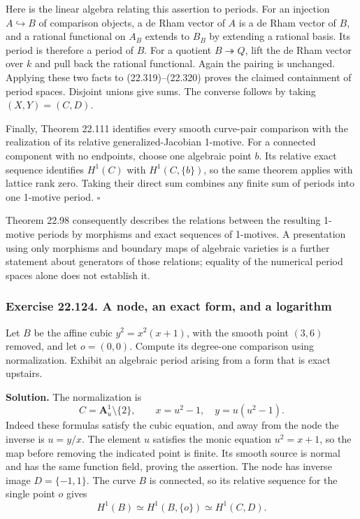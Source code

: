 \documentclass[
  11pt,
  a4paper,
]{article}
\begin{document}
Here is the linear algebra relating this assertion to periods. For an
injection \(A\hookrightarrow B\) of comparison objects, a de Rham vector
of \(A\) is a de Rham vector of \(B\), and a rational functional on
\(A_B\) extends to \(B_B\) by extending a rational basis. Its period is
therefore a period of \(B\). For a quotient \(B\twoheadrightarrow Q\),
lift the de Rham vector over \(k\) and pull back the rational
functional. Again the pairing is unchanged. Applying these two facts to
(22.319)--(22.320) proves the claimed containment of period spaces.
Disjoint unions give sums. The converse follows by taking
\((X,Y)=(C,D)\).

Finally, Theorem 22.111 identifies every smooth curve-pair comparison
with the realization of its relative generalized-Jacobian 1-motive. For
a connected component with no endpoints, choose one algebraic point
\(b\). Its relative exact sequence identifies \(H^1(C)\) with
\(H^1(C,\{b\})\), so the same theorem applies with lattice rank zero.
Taking their direct sum combines any finite sum of periods into one
1-motive period. \(\square\)

Theorem 22.98 consequently describes the relations between the resulting
1-motive periods by morphisms and exact sequences of 1-motives. A
presentation using only morphisms and boundary maps of algebraic
varieties is a further statement about generators of those relations;
equality of the numerical period spaces alone does not establish it.

\subsubsection{Exercise 22.124. A node, an exact form, and a
logarithm}\label{exercise-22.124.-a-node-an-exact-form-and-a-logarithm}

Let \(B\) be the affine cubic \(y^2=x^2(x+1)\), with the smooth point
\((3,6)\) removed, and let \(o=(0,0)\). Compute its degree-one
comparison using normalization. Exhibit an algebraic period arising from
a form that is exact upstairs.

\textbf{Solution.} The normalization is \[
 C=\mathbf A^1_u\setminus\{2\},\qquad
 x=u^2-1,\quad y=u(u^2-1).
 \tag{22.321}
\] Indeed these formulas satisfy the cubic equation, and away from the
node the inverse is \(u=y/x\). The element \(u\) satisfies the monic
equation \(u^2=x+1\), so the map before removing the indicated point is
finite. Its smooth source is normal and has the same function field,
proving the assertion. The node has inverse image \(D=\{-1,1\}\). The
curve \(B\) is connected, so its relative sequence for the single point
\(o\) gives \[
 H^1(B)\simeq H^1(B,\{o\})\simeq H^1(C,D).
 \tag{22.322}
\]
\end{document}
